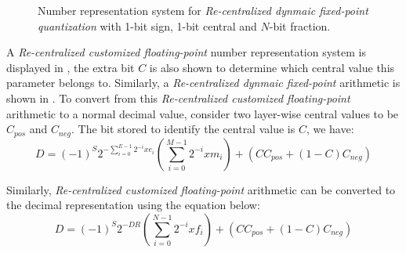 \documentclass[a4paper,12pt]{report}
\begin{document}
\begin{figure}[!h]
\centering
{}
\caption{Number representation system for \textit{Re-centralized dynmaic fixed-point quantization} with
1-bit sign, 1-bit central and $N$-bit fraction.}
\label{fig:number_rep_cdfp}
\end{figure}

A \textit{Re-centralized customized floating-point} number representation system
is displayed in ,
the extra bit $C$ is also shown to determine which central value this parameter
belongs to.
Similarly, a \textit{Re-centralized dynmaic fixed-point} arithmetic is shown in
.
To convert from this \textit{Re-centralized customized floating-point} arithmetic to a normal decimal value, consider two
layer-wise central values to be $C_{pos}$ and $C_{neg}$.
The bit stored to identify the central value is $C$, we have:
\begin{equation}
    D = (-1)^S 2^{-\sum^{E-1}_{i=0}2^{-i}xe_i}(\sum^{M-1}_{i=0}2^{-i}xm_i) + (C C_{pos} + (1-C)C_{neg})
    \label{equ:d2dfp}
\end{equation}

Similarly, \textit{Re-centralized customized floating-point} arithmetic can be converted
to the decimal representation using the equation below:
\begin{equation}
    D = (-1)^S 2^{-DR}(\sum^{N-1}_{i=0}2^{-i}xf_i) + (C C_{pos} + (1-C)C_{neg})
    \label{equ:d2dfp}
\end{equation}
\end{document}
